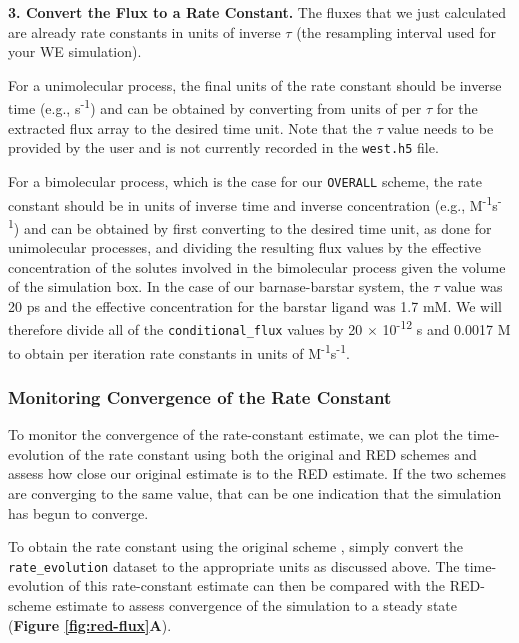 \textbf{3. Convert the Flux to a Rate Constant.} The fluxes that we just calculated are already rate constants in units of inverse $\tau$ (the resampling interval used for your WE simulation). 

For a unimolecular process, the final units of the rate constant should be inverse time (e.g., s\textsuperscript{-1}) and can be obtained by converting from units of per $\tau$ for the extracted flux array to the desired time unit.
Note that the $\tau$ value needs to be provided by the user and is not currently recorded in the \verb|west.h5| file.

For a bimolecular process, which is the case for our \verb|OVERALL| scheme, the rate constant should be in units of inverse time and inverse concentration (e.g., M\textsuperscript{-1}s\textsuperscript{-1}) and can be obtained by first converting to the desired time unit, as done for unimolecular processes, and dividing the resulting flux values by the effective concentration of the solutes involved in the bimolecular process given the volume of the simulation box.
In the case of our barnase-barstar system, the $\tau$ value was 20 ps and the effective concentration for the barstar ligand was 1.7 mM.
We will therefore divide all of the \verb|conditional_flux| values by 20 $\times$ 10\textsuperscript{-12} s and 0.0017 M to obtain per iteration rate constants in units of M\textsuperscript{-1}s\textsuperscript{-1}.

\subsubsection{Monitoring Convergence of the Rate Constant}  

To monitor the convergence of the rate-constant estimate, we can plot the time-evolution of the rate constant using both the original and RED schemes and assess how close our original estimate is to the RED estimate.
If the two schemes are converging to the same value, that can be one indication that the simulation has begun to converge.

To obtain the rate constant using the original scheme \citep{huber_weighted-ensemble_1996}, simply convert the \verb|rate_evolution| dataset to the appropriate units as discussed above.
The time-evolution of this rate-constant estimate can then be compared with the RED-scheme estimate to assess convergence of the simulation to a steady state (\textbf{Figure \ref{fig:red-flux}A}).

